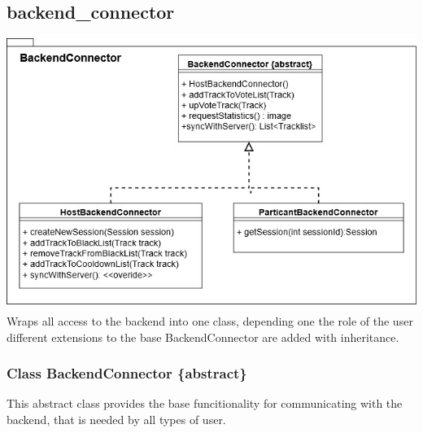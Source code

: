 \documentclass[oneside, nenglish]{sdqtechreport}
\begin{document}
\subsection{backend\_connector}

\includegraphics[width = 16cm]{LATEX/Entwurf/Graphics/BackendConnector.jpg}
Wraps all access to the backend into one class, depending one the role of the user different extensions to the base BackendConnector are added with inheritance. 



 \subsubsection{Class BackendConnector \{abstract\}}
 This abstract class provides the base funcitionality for communicating with the backend, that is needed by all types of user.
\end{document}
